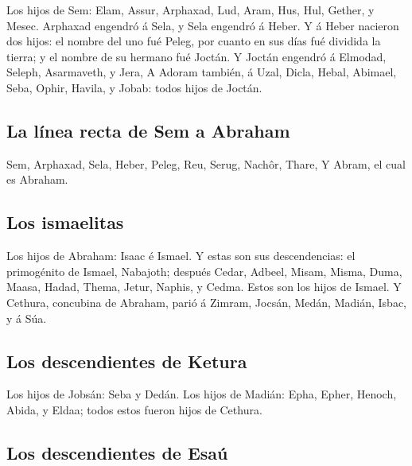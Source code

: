  Los hijos de Sem: Elam, Assur, Arphaxad, Lud, Aram, Hus,
Hul, Gether, y Mesec.  Arphaxad engendró á Sela, y Sela
engendró á Heber.  Y á Heber nacieron dos hijos: el nombre
del uno fué Peleg, por cuanto en sus días fué dividida la tierra; y el
nombre de su hermano fué Joctán.  Y Joctán engendró á
Elmodad, Seleph, Asarmaveth, y Jera,  A Adoram también, á
Uzal, Dicla,  Hebal, Abimael, Seba,  Ophir,
Havila, y Jobab: todos hijos de Joctán.

\hypertarget{la-luxednea-recta-de-sem-a-abraham}{%
\subsection{La línea recta de Sem a
Abraham}\label{la-luxednea-recta-de-sem-a-abraham}}

 Sem, Arphaxad, Sela,  Heber, Peleg, Reu,
 Serug, Nachôr, Thare,  Y Abram, el cual es
Abraham.

\hypertarget{los-ismaelitas}{%
\subsection{Los ismaelitas}\label{los-ismaelitas}}

 Los hijos de Abraham: Isaac é Ismael.  Y
estas son sus descendencias: el primogénito de Ismael, Nabajoth; después
Cedar, Adbeel, Misam,  Misma, Duma, Maasa, Hadad, Thema,
Jetur, Naphis, y Cedma. Estos son los hijos de Ismael.  Y
Cethura, concubina de Abraham, parió á Zimram, Jocsán, Medán, Madián,
Isbac, y á Súa.

\hypertarget{los-descendientes-de-ketura}{%
\subsection{Los descendientes de
Ketura}\label{los-descendientes-de-ketura}}

 Los hijos de Jobsán: Seba y Dedán.  Los hijos
de Madián: Epha, Epher, Henoch, Abida, y Eldaa; todos estos fueron hijos
de Cethura.

\hypertarget{los-descendientes-de-esauxfa}{%
\subsection{Los descendientes de
Esaú}\label{los-descendientes-de-esauxfa}}

